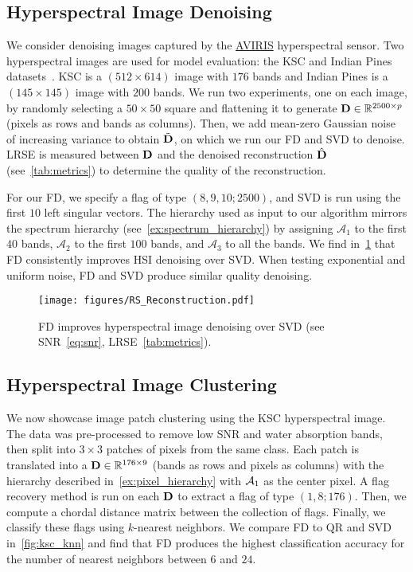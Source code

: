\subsection{Hyperspectral Image Denoising}\label{sec: denoising_hs}
We consider denoising images captured by the \href{https://aviris.jpl.nasa.gov/}{AVIRIS} hyperspectral sensor. Two hyperspectral images are used for model evaluation: the KSC and Indian Pines datasets~\cite{Bandos09}. KSC is a $(512\times614)$ image with $176$ bands and Indian Pines is a $(145\times145)$ image with $200$ bands. 
We run two experiments, one on each image, by randomly selecting a $50 \times 50$ square and flattening it to generate $\mathbf{D} \in \mathbb{R}^{2500 \times p}$ (pixels as rows and bands as columns). Then, we add mean-zero Gaussian noise of increasing variance to obtain $\tilde{\mathbf{D}}$, on which we run our FD and SVD to denoise. LRSE is measured between $\mathbf{D}$ and the denoised reconstruction $\hat{\mathbf{D}}$ (see~\ref{tab:metrics}) to determine the quality of the reconstruction.

For our FD, we specify a flag of type $(8,9,10;2500)$, and SVD is run using the first $10$ left singular vectors. The hierarchy used as input to our algorithm mirrors the spectrum hierarchy (see~\cref{ex:spectrum_hierarchy}) by assigning $\mathcal{A}_1$ to the first $40$ bands, $\mathcal{A}_2$ to the first $100$ bands, and $\mathcal{A}_3$ to all the bands. We find in~\cref{fig:hsi denoising} that FD consistently improves HSI denoising over SVD. When testing exponential and uniform noise, FD and SVD produce similar quality denoising. 

\begin{figure}[t]
    \vspace{-.3cm}
    \centering
    \texttt{[image: figures/RS\_Reconstruction.pdf]}
    \caption{FD improves hyperspectral image denoising over SVD (see SNR~\cref{eq:snr}, LRSE~\cref{tab:metrics}). \vspace{-5mm}}
    \label{fig:hsi denoising}
\end{figure}


\subsection{Hyperspectral Image Clustering}\label{sec: clustering}
We now showcase image patch clustering using the KSC hyperspectral image.  
The data was pre-processed to remove low SNR and water absorption bands, then split into $3 \times 3$ patches of pixels from the same class. Each patch is translated into a $\mathbf{D} \in \mathbb{R}^{176 \times 9}$ (bands as rows and pixels as columns) with the hierarchy described in~\cref{ex:pixel_hierarchy} with $\mathcal{A}_1$ as the center pixel. A flag recovery method is run on each $\mathbf{D}$ to extract a flag of type $(1,8;176)$. Then, we compute a chordal distance matrix between the collection of flags. Finally, we classify these flags using $k$-nearest neighbors. We compare FD to QR and SVD in~\cref{fig:ksc_knn} and find that FD produces the highest classification accuracy for the number of nearest neighbors between $6$ and $24$.

